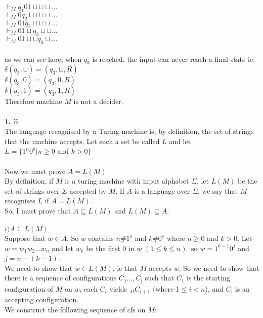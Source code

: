 \documentclass[a4paper,12pt]{article}
\begin{document}
\newpage
$\vdash_M q_1 0 1 \sqcup \sqcup \sqcup \dots$ \\
$\vdash_M 0 q_2 1 \sqcup \sqcup \sqcup \dots$ \\
$\vdash_M 0 1 q_3 \sqcup \sqcup \sqcup \dots$ \\
$\vdash_M 0 1 \sqcup q_3 \sqcup \sqcup \dots$ \\
$\vdash_M 0 1 \sqcup \sqcup q_3 \sqcup \dots$ \\
\\
as we can see here, when $q_3$ is reached, the input can never reach a final state ie: \\
$\delta ( q_3 , \sqcup ) = ( q_3 , \sqcup , R )$ \\
$\delta ( q_3 , 0 ) = ( q_3 , 0 , R )$ \\
$\delta ( q_3 , 1 ) = ( q_3 , 1 , R )$ \\
Therefore machine $M$ is not a decider. \\
\\
\textbf{1. ii} \\
The language recognised by a Turing-machine is, by definition, the set of strings that the machine accepts. Let such a set be called $L$ and let \\
$L=\{1^n 0^k | n \geq 0$ and $k > 0\}$ \\
\\
Now we must prove $A=L(M)$ \\
By definition, if $M$ is a turing machine with input alphabet $\Sigma$, let $L(M)$ be the set of strings over $\Sigma$ accepted by $M$. If $A$ is a language over $\Sigma$, we say that $M$ recognises $L$ if $A=L(M)$. \\
So, I must prove that $A \subseteq L(M)$ and $L(M) \subseteq A$. \\
\\
$i) A \subseteq L(M)$ \\
Suppose that $w \in A$. So $w$ contains $n\#1^s$ and $k\#0^s$ where $n \geq 0$ and $k > 0$. Let $w = w_1 w_2 \dots w_n$ and let $w_k$ be the first $0$ in $w$ $(1 \leq  k \leq n)$.
so $w = 1^{k-1}0^{j}$ and $j = n - ( k - 1)$. \\ 
We need to show that $w \in L(M)$, ie that $M$ accepts $w$. So we need to show that there is a sequence of configurations $C_1 \dots, C_|$ such that $C_1$ is the starting configuration of $M$ on $w$, each $C_i$ yields $_M C_{i+1}$ (where $1 \leq i < n $), and $C_|$ is an accepting configuration. \\
We construct the following sequence of cfs on $M$: \\
\end{document}
